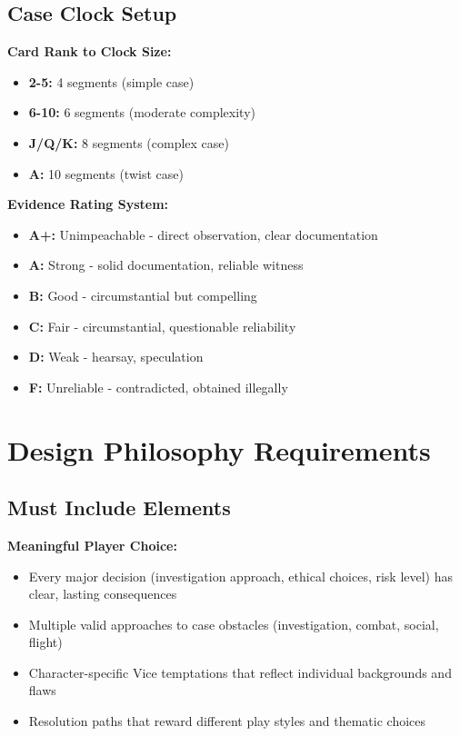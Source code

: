 \documentclass[11pt]{article}
\begin{document}
\subsection{Case Clock Setup}

\textbf{Card Rank to Clock Size:}
\begin{itemize}
\item \textbf{2-5:} 4 segments (simple case)
\item \textbf{6-10:} 6 segments (moderate complexity)
\item \textbf{J/Q/K:} 8 segments (complex case)
\item \textbf{A:} 10 segments (twist case)
\end{itemize}

\textbf{Evidence Rating System:}
\begin{itemize}
\item \textbf{A+:} Unimpeachable - direct observation, clear documentation
\item \textbf{A:} Strong - solid documentation, reliable witness
\item \textbf{B:} Good - circumstantial but compelling
\item \textbf{C:} Fair - circumstantial, questionable reliability
\item \textbf{D:} Weak - hearsay, speculation
\item \textbf{F:} Unreliable - contradicted, obtained illegally
\end{itemize}

\section{Design Philosophy Requirements}

\subsection{Must Include Elements}

\textbf{Meaningful Player Choice:}
\begin{itemize}
\item Every major decision (investigation approach, ethical choices, risk level) has clear, lasting consequences
\item Multiple valid approaches to case obstacles (investigation, combat, social, flight)
\item Character-specific Vice temptations that reflect individual backgrounds and flaws
\item Resolution paths that reward different play styles and thematic choices
\end{itemize}
\end{document}
